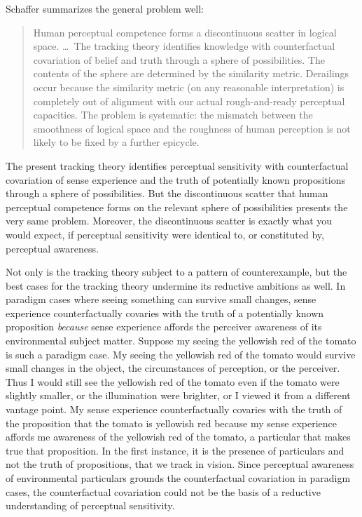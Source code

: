 \documentclass[12pt]{article}
\begin{document}
Schaffer summarizes the general problem well:
\begin{quote}
    Human perceptual competence forms a discontinuous scatter in logical space. \ldots\ The tracking theory identifies knowledge with counterfactual covariation of belief and truth through a sphere of possibilities. The contents of the sphere are determined by the similarity metric. Derailings occur because the similarity metric (on any reasonable interpretation) is completely out of alignment with our actual rough-and-ready perceptual capacities. The problem is systematic: the mismatch between the smoothness of logical space and the roughness of human perception is not likely to be fixed by a further epicycle. \citep[42]{Schaffer:2003vn}
\end{quote}
The present tracking theory identifies perceptual sensitivity with counterfactual covariation of sense experience and the truth of potentially known propositions through a sphere of possibilities. But the discontinuous scatter that human perceptual competence forms on the relevant sphere of possibilities presents the very same problem. Moreover, the discontinuous scatter is exactly what you would expect, if perceptual sensitivity were identical to, or constituted by, perceptual awareness. 

Not only is the tracking theory subject to a pattern of counterexample, but the best cases for the tracking theory undermine its reductive ambitions as well. In paradigm cases where seeing something can survive small changes, sense experience counterfactually covaries with the truth of a potentially known proposition \emph{because} sense experience affords the perceiver awareness of its environmental subject matter. Suppose my seeing the yellowish red of the tomato is such a paradigm case. My seeing the yellowish red of the tomato would survive small changes in the object, the circumstances of perception, or the perceiver. Thus I would still see the yellowish red of the tomato even if the tomato were slightly smaller, or the illumination were brighter, or I viewed it from a different vantage point. My sense experience counterfactually covaries with the truth of the proposition that the tomato is yellowish red because my sense experience affords me awareness of the yellowish red of the tomato, a particular that makes true that proposition. In the first instance, it is the presence of particulars and not the truth of propositions, that we track in vision. Since perceptual awareness of environmental particulars grounds the counterfactual covariation in paradigm cases, the counterfactual covariation could not be the basis of a reductive understanding of perceptual sensitivity.
\end{document}
